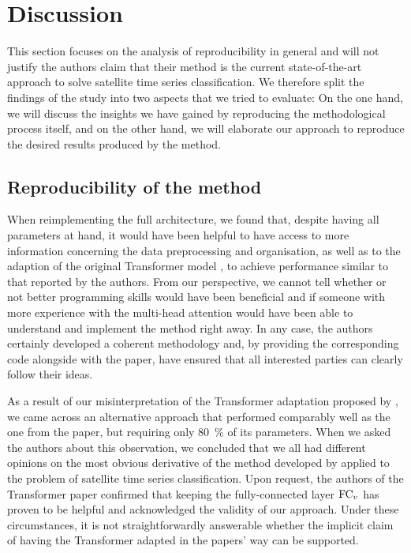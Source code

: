 \section{Discussion}

This section focuses on the analysis of reproducibility in general and will not justify the authors claim that their method is the current state-of-the-art approach to solve satellite time series classification.
We therefore split the findings of the study into two aspects that we tried to evaluate:
On the one hand, we will discuss the insights we have gained by reproducing the methodological process itself, and on the other hand, we will elaborate our approach to reproduce the desired results produced by the method.

\subsection{Reproducibility of the method}

When reimplementing the full architecture, we found that, despite having all parameters at hand, it would have been helpful to have access to more information concerning the data preprocessing and organisation, as well as to the adaption of the original Transformer model \parencite{Vaswani17:Attention}, to achieve performance similar to that reported by the authors.
From our perspective, we cannot tell whether or not better \python programming skills would have been beneficial and if someone with more experience with the multi-head attention would have been able to understand and implement the method right away.
In any case, the authors certainly developed a coherent methodology and, by providing the corresponding code alongside with the paper, have ensured that all interested parties can clearly follow their ideas.

As a result of our misinterpretation of the Transformer adaptation proposed by \citeauthor{Garnot20:SIT}, we came across an alternative approach that performed comparably well as the one from the paper, but requiring only \SI{80}{\percent} of its parameters.
When we asked the authors about this observation, we concluded that we all had different opinions on the most obvious derivative of the method developed by \textcite{Vaswani17:Attention} applied to the problem of satellite time series classification.
Upon request, the authors of the Transformer paper confirmed that keeping the fully-connected layer $\operatorname{FC}_v$ has proven to be helpful and acknowledged the validity of our approach.
Under these circumstances, it is not straightforwardly answerable whether the implicit claim of having the Transformer adapted in the papers' way can be supported.

